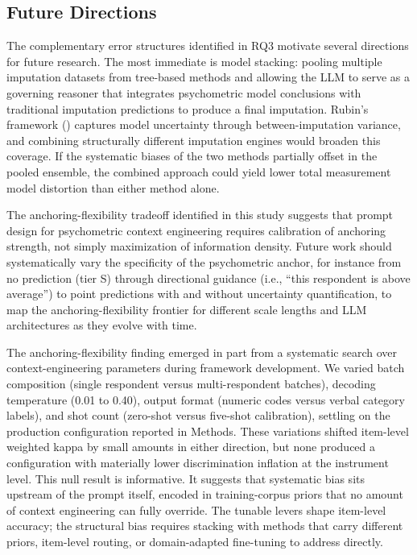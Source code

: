 \documentclass[
  man,
  floatsintext,
  longtable,
  nolmodern,
  notxfonts,
  notimes,
  colorlinks=true,linkcolor=blue,citecolor=blue,urlcolor=blue]{apa7}
\begin{document}
\subsection{Future Directions}\label{future-directions}

The complementary error structures identified in RQ3 motivate several
directions for future research. The most immediate is model stacking:
pooling multiple imputation datasets from tree-based methods and
allowing the LLM to serve as a governing reasoner that integrates
psychometric model conclusions with traditional imputation predictions
to produce a final imputation. Rubin's framework
() captures model uncertainty
through between-imputation variance, and combining structurally
different imputation engines would broaden this coverage. If the
systematic biases of the two methods partially offset in the pooled
ensemble, the combined approach could yield lower total measurement
model distortion than either method alone.

The anchoring-flexibility tradeoff identified in this study suggests
that prompt design for psychometric context engineering requires
calibration of anchoring strength, not simply maximization of
information density. Future work should systematically vary the
specificity of the psychometric anchor, for instance from no prediction
(tier S) through directional guidance (i.e., ``this respondent is above
average'') to point predictions with and without uncertainty
quantification, to map the anchoring-flexibility frontier for different
scale lengths and LLM architectures as they evolve with time.

The anchoring-flexibility finding emerged in part from a systematic
search over context-engineering parameters during framework development.
We varied batch composition (single respondent versus multi-respondent
batches), decoding temperature (0.01 to 0.40), output format (numeric
codes versus verbal category labels), and shot count (zero-shot versus
five-shot calibration), settling on the production configuration
reported in Methods. These variations shifted item-level weighted kappa
by small amounts in either direction, but none produced a configuration
with materially lower discrimination inflation at the instrument level.
This null result is informative. It suggests that systematic bias sits
upstream of the prompt itself, encoded in training-corpus priors that no
amount of context engineering can fully override. The tunable levers
shape item-level accuracy; the structural bias requires stacking with
methods that carry different priors, item-level routing, or
domain-adapted fine-tuning to address directly.
\end{document}
